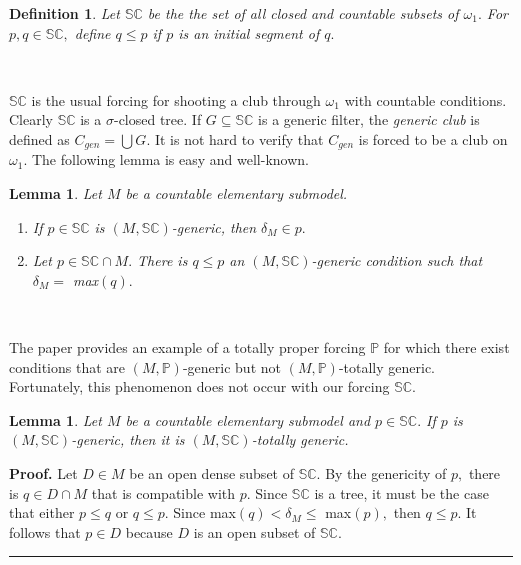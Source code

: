 \documentclass{article}
\newtheorem{definition}[theorem]{Definition}
\newtheorem{lemma}[theorem]{Lemma}
\newenvironment{proof}[1][Proof]{\noindent\textbf{#1.} }{\ \rule{0.5em}{0.5em}}
\begin{document}
\begin{definition}
Let $\mathbb{SC}$ be the the set of all closed and countable subsets of
$\omega_{1}.$ For $p,q\in\mathbb{SC},$ define $q\leq p$ if $p$ is an initial
segment of $q.$
\end{definition}

\qquad\ \ \ \ 

$\mathbb{SC}$ is the usual forcing for shooting a club through $\omega_{1}$
with countable conditions. Clearly $\mathbb{SC}$ is a $\sigma$-closed tree. If
$G\subseteq\mathbb{SC}$ is a generic filter, the \emph{generic club }is
defined as $C_{gen}=\bigcup G.$ It is not hard to verify that $C_{gen}$ is
forced to be a club on $\omega_{1}.$ The following lemma is easy and well-known.

\begin{lemma}
Let $M$ be a countable elementary submodel. \label{Lemma SC basic generic}

\begin{enumerate}
\item If $p\in\mathbb{SC}$ is $(M,\mathbb{SC})$-generic, then $\delta_{M}\in
p.$

\item Let $p\in\mathbb{SC}\cap M.$ There is $q\leq p$ an $(M,\mathbb{SC}%
)$-generic condition such that $\delta_{M}=$ \textsf{max}$\left(  q\right)  .$
\end{enumerate}
\end{lemma}

\qquad\ \ \qquad\ \ \ 

The paper \cite{IteratedForcingandCH} provides an example of a totally proper
forcing $\mathbb{P}$ for which there exist conditions that are $(M,\mathbb{P}%
)$-generic but not $(M,\mathbb{P})$-totally generic. Fortunately, this
phenomenon does not occur with our forcing $\mathbb{SC}.$

\begin{lemma}
Let $M$ be a countable elementary submodel and $p\in\mathbb{SC}.$ If $p$ is
$(M,\mathbb{SC})$-generic, then it is $(M,\mathbb{SC})$-totally generic.
\end{lemma}

\begin{proof}
Let $D\in M$ be an open dense subset of $\mathbb{SC}.$ By the genericity of
$p,$ there is $q\in D\cap M$ that is compatible with $p.$ Since $\mathbb{SC}$
is a tree, it must be the case that either $p\leq q$ or $q\leq p.$ Since
\textsf{max}$\left(  q\right)  <\delta_{M}\leq$ \textsf{max}$\left(  p\right)
,$ then $q\leq p.$ It follows that $p\in D$ because $D$ is an open subset of
$\mathbb{SC}.$
\end{proof}
\end{document}
